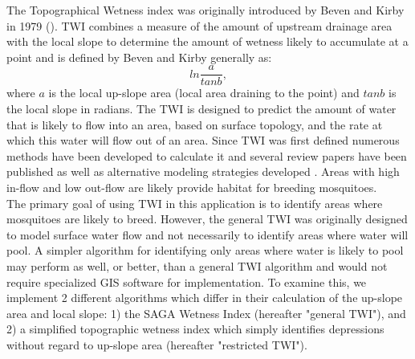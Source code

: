 \documentclass{article}\usepackage[]{graphicx}\usepackage[]{color}
\begin{document}
The Topographical Wetness index was originally introduced by Beven and Kirby in 1979 (\cite{Beven1979}).  TWI combines a measure of the amount of upstream drainage area with the local slope to determine the amount of wetness likely to accumulate at a point and is defined by Beven and Kirby generally as:
$$ln\frac{a}{tanb},$$
where $a$ is the local up-slope area (local area draining to the point) and $tanb$ is the local slope in radians.  The TWI is designed to predict the amount of water that is likely to flow into an area, based on surface topology, and the rate at which this water will flow out of an area.  Since TWI was first defined numerous methods have been developed to calculate it and several review papers have been published \cite{Quinn1995,Sørensen2006} as well as alternative modeling strategies developed \cite{Grabs2009}.  Areas with high in-flow and low out-flow are likely provide habitat for breeding mosquitoes. \\

The primary goal of using TWI in this application is to identify areas where mosquitoes are likely to breed.  However, the general TWI was originally designed to model surface water flow and not necessarily to identify areas where water will pool. A simpler algorithm for identifying only areas where water is likely to pool may perform as well, or better, than a general TWI algorithm and would not require specialized GIS software for implementation.  To examine this, we implement 2 different algorithms which differ in their calculation of the up-slope area and local slope: 1) the SAGA Wetness Index \cite{Bohner2002} (hereafter "general TWI"), and 2) a simplified topographic wetness index which simply identifies depressions without regard to up-slope area (hereafter "restricted TWI").  \\
\end{document}
